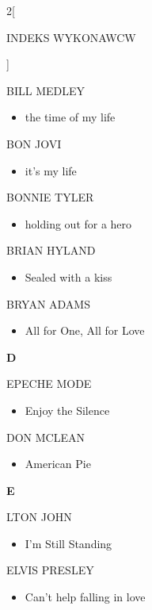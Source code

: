 \documentclass[a4paper]{report}
\begin{document}
\begin{multicols*}{2}[\begin{Huge}INDEKS WYKONAWCW\end{Huge}\vspace{1cm}]
\begin{itemize}[topsep=0pt]
\end{itemize}
 BILL MEDLEY 
\begin{itemize}[topsep=0pt]
\itemsep0em
\item[]  the time of my life   \\
\end{itemize}
 BON JOVI 
\begin{itemize}[topsep=0pt]
\itemsep0em
\item[]  it's my life   \\
\end{itemize}
 BONNIE TYLER 
\begin{itemize}[topsep=0pt]
\itemsep0em
\item[]  holding out for a hero   \\
\end{itemize}
 BRIAN HYLAND 
\begin{itemize}[topsep=0pt]
\itemsep0em
\item[]  Sealed with a kiss   \\
\end{itemize}
 BRYAN ADAMS 
\begin{itemize}[topsep=0pt]
\itemsep0em
\item[]  All for One, All for Love   \\
\end{itemize}
 \begin{Large}\textbf{D}\end{Large}EPECHE MODE 
\begin{itemize}[topsep=0pt]
\itemsep0em
\item[]  Enjoy the Silence   \\
\end{itemize}
 DON MCLEAN 
\begin{itemize}[topsep=0pt]
\itemsep0em
\item[]  American Pie   \\
\end{itemize}
 \begin{Large}\textbf{E}\end{Large}LTON JOHN 
\begin{itemize}[topsep=0pt]
\itemsep0em
\item[]  I'm Still Standing   \\
\end{itemize}
 ELVIS PRESLEY 
\begin{itemize}[topsep=0pt]
\itemsep0em
\item[]  Can't help falling in love   \\

\end{itemize}
\end{multicols*}
\end{document}

